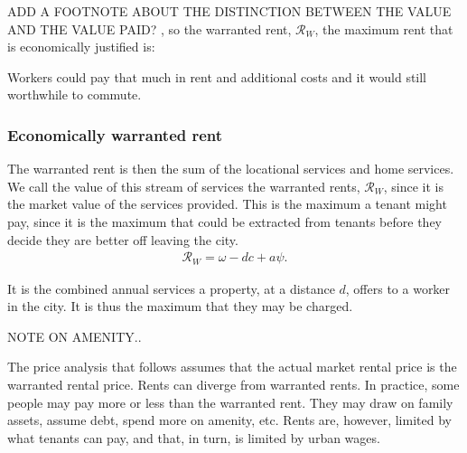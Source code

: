 ADD A FOOTNOTE ABOUT THE DISTINCTION BETWEEN THE VALUE AND THE VALUE PAID? %
, so the warranted rent, $\mathcal{R}_W$, the maximum rent that is economically justified is:

Workers could pay that much in rent and additional costs and it would still worthwhile to commute. 

\subsubsection{Economically warranted rent}
The warranted rent is then the sum of the locational services and home services.
We call the value of this stream of services the \glspl{warranted rent}, $\mathcal{R}_W$, since it is the market value of the services provided. This is the maximum a tenant might pay, since it is the maximum that could be extracted from tenants before they decide they are better off leaving the city.
\begin{align}
\mathcal{R}_W=\omega- {dc} + a\psi.
\label{eqn-housing-price}
\end{align}

It is the combined annual services a property, at a distance $d$, offers to a worker in the city. It is thus the maximum that they may be charged.

NOTE ON AMENITY..

The price analysis that follows assumes that the actual market rental price is the warranted rental price. Rents can diverge from warranted rents. In practice, some people may pay more or less than the warranted rent. They may draw on family assets, assume debt, spend more on amenity, etc. Rents are, however, limited by what tenants can pay, and that, in turn, is limited by urban wages. 

